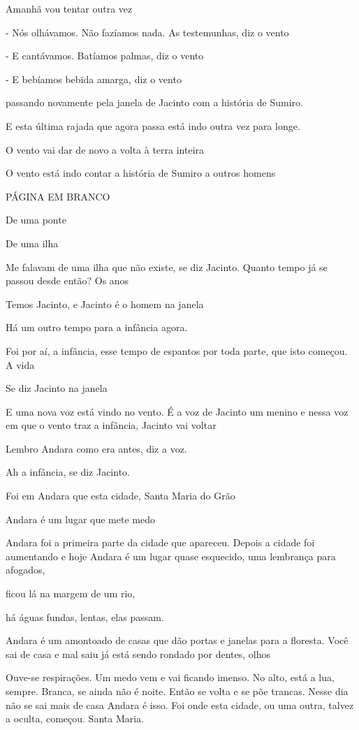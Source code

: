 Amanhã vou tentar outra vez

- Nós olhávamos. Não fazíamos nada. As testemunhas, diz o vento

- E cantávamos. Batíamos palmas, diz o vento

- E bebíamos bebida amarga, diz o vento

passando novamente pela janela de Jacinto com a história de Sumiro.

E esta última rajada que agora passa está indo outra vez para longe.

O vento vai dar de novo a volta à terra inteira

O vento está indo contar a história de Sumiro a outros homens

PÁGINA EM BRANCO

De uma ponte

De uma ilha

Me falavam de uma ilha que não existe, se diz Jacinto. Quanto tempo já
se passou desde então? Os anos

Temos Jacinto, e Jacinto é o homem na janela

Há um outro tempo para a infância agora.

Foi por aí, a infância, esse tempo de espantos por toda parte, que isto
começou. A vida

Se diz Jacinto na janela

E uma nova voz está vindo no vento. É a voz de Jacinto um menino e nessa
voz em que o vento traz a infância, Jacinto vai voltar

Lembro Andara como era antes, diz a voz.

Ah a infância, se diz Jacinto.

Foi em Andara que esta cidade, Santa Maria do Grão

Andara é um lugar que mete medo

Andara foi a primeira parte da cidade que apareceu. Depois a cidade foi
aumentando e hoje Andara é um lugar quase esquecido, uma lembrança para
afogados,

ficou lá na margem de um rio,

há águas fundas, lentas, elas passam.

Andara é um amontoado de casas que dão portas e janelas para a floresta.
Você sai de casa e mal saiu já está sendo rondado por dentes, olhos

Ouve-se respirações. Um medo vem e vai ficando imenso. No alto, está a
lua, sempre. Branca, se ainda não é noite. Então se volta e se põe
trancas. Nesse dia não se sai mais de casa Andara é isso. Foi onde esta
cidade, ou uma outra, talvez a oculta, começou. Santa Maria.

